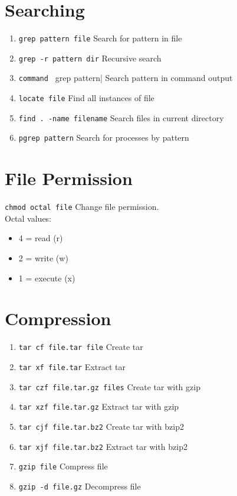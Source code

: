 \documentclass[a4paper,12pt]{article}
\begin{document}
\section{Searching}
\begin{enumerate}
  \item \texttt{grep pattern file} \quad Search for pattern in file
  \item \texttt{grep -r pattern dir} \quad Recursive search
  \item \verb|command | grep pattern| \quad Search pattern in command output
  \item \texttt{locate file} \quad Find all instances of file
  \item \texttt{find . -name filename} \quad Search files in current directory
  \item \texttt{pgrep pattern} \quad Search for processes by pattern
\end{enumerate}

\section{File Permission}
\texttt{chmod octal file} \quad Change file permission. \\
Octal values:
\begin{itemize}
  \item 4 = read (r)
  \item 2 = write (w)
  \item 1 = execute (x)
\end{itemize}

\section{Compression}
\begin{enumerate}
  \item \texttt{tar cf file.tar file} \quad Create tar
  \item \texttt{tar xf file.tar} \quad Extract tar
  \item \texttt{tar czf file.tar.gz files} \quad Create tar with gzip
  \item \texttt{tar xzf file.tar.gz} \quad Extract tar with gzip
  \item \texttt{tar cjf file.tar.bz2} \quad Create tar with bzip2
  \item \texttt{tar xjf file.tar.bz2} \quad Extract tar with bzip2
  \item \texttt{gzip file} \quad Compress file
  \item \texttt{gzip -d file.gz} \quad Decompress file
\end{enumerate}
\end{document}
